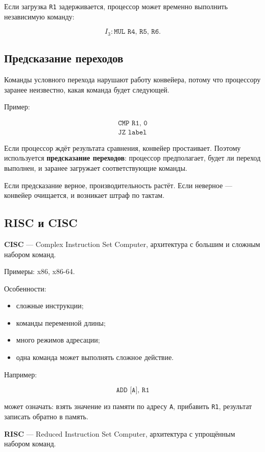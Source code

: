 \documentclass[12pt,a4paper]{article}
\theoremstyle{remark}
\begin{document}
Если загрузка \texttt{R1} задерживается, процессор может временно выполнить независимую команду:

\[
I_3: \texttt{MUL R4, R5, R6}.
\]

\subsection{Предсказание переходов}

Команды условного перехода нарушают работу конвейера, потому что процессору заранее неизвестно, какая команда будет следующей.

Пример:

\[
\begin{array}{l}
\texttt{CMP R1, 0} \\
\texttt{JZ label}
\end{array}
\]

Если процессор ждёт результата сравнения, конвейер простаивает. Поэтому используется \textbf{предсказание переходов}: процессор предполагает, будет ли переход выполнен, и заранее загружает соответствующие команды.

Если предсказание верное, производительность растёт. Если неверное --- конвейер очищается, и возникает штраф по тактам.

\subsection{RISC и CISC}

\textbf{CISC} --- Complex Instruction Set Computer, архитектура с большим и сложным набором команд.

Примеры: x86, x86-64.

Особенности:
\begin{itemize}
    \item сложные инструкции;
    \item команды переменной длины;
    \item много режимов адресации;
    \item одна команда может выполнять сложное действие.
\end{itemize}

Например:

\[
\texttt{ADD [A], R1}
\]

может означать: взять значение из памяти по адресу \texttt{A}, прибавить \texttt{R1}, результат записать обратно в память.

\textbf{RISC} --- Reduced Instruction Set Computer, архитектура с упрощённым набором команд.
\end{document}
